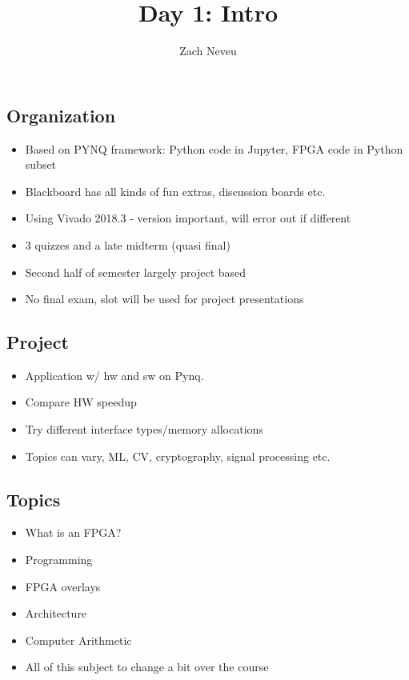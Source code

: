 \documentclass[12pt, letter]{article}
\author{Zach Neveu}
\title{ Day 1: Intro }
\begin{document}
\maketitle

\subsection*{Organization}
\begin{itemize}
	\item Based on PYNQ framework: Python code in Jupyter, FPGA code in Python subset
	\item Blackboard has all kinds of fun extras, discussion boards etc.
	\item Using Vivado 2018.3 - version important, will error out if different
	\item 3 quizzes and a late midterm (quasi final)
	\item Second half of semester largely project based
	\item No final exam, slot will be used for project presentations
\end{itemize}

\subsection*{Project}
\begin{itemize}
	\item Application w/ hw and sw on Pynq.
	\item Compare HW speedup
	\item Try different interface types/memory allocations
	\item Topics can vary, ML, CV, cryptography, signal processing etc.
\end{itemize}

\subsection*{Topics}
\begin{itemize}
	\item What is an FPGA?
	\item Programming
	\item FPGA overlays
	\item Architecture
	\item Computer Arithmetic
	\item All of this subject to change a bit over the course
\end{itemize}
\end{document}
